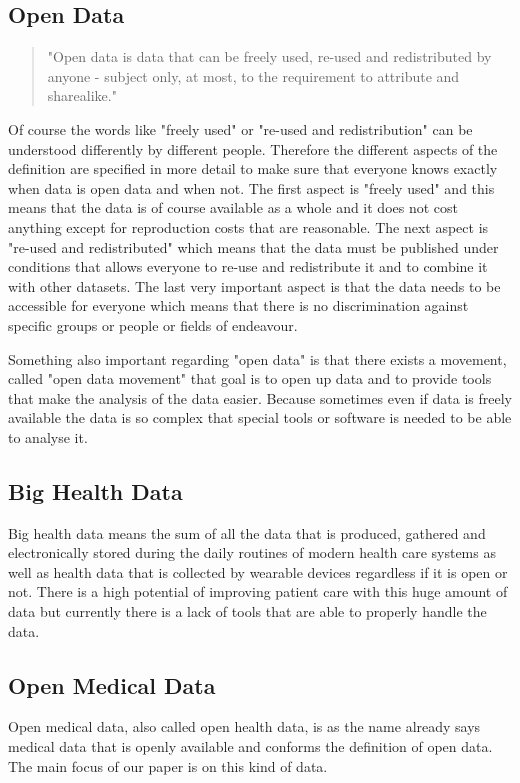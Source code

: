 \documentclass[a4paper, 11pt]{article}
\begin{document}
\subsection{Open Data}
\begin{quote}
    "Open data is data that can be freely used, re-used and redistributed by anyone - subject only, at most, to the requirement to attribute and sharealike." \cite{whatIsOpenData}
\end{quote}
Of course the words like "freely used" or "re-used and redistribution" can be understood differently by different people. Therefore the different aspects of the definition are specified in more detail to make sure that everyone knows exactly when data is open data and when not. The first aspect is "freely used" and this means that the data is of course available as a whole and it does not cost anything except for reproduction costs that are reasonable. 
The next aspect is "re-used and redistributed" which means that the data must be published under conditions that allows everyone to re-use and redistribute it and to combine it with other datasets. 
The last very important aspect is that the data needs to be accessible for everyone which means that there is no discrimination against specific groups or people or fields of endeavour. \cite{whatIsOpenData}

Something also important regarding "open data" is that there exists a movement, called "open data movement" that goal is to open up data and to provide tools that make the analysis of the data easier. Because sometimes even if data is freely available the data is so complex that special tools or software is needed to be able to analyse it. \cite{kitchin2014dataRevolution}

\subsection{Big Health Data}
Big health data means the sum of all the data that is produced, gathered and electronically stored during the daily routines of modern health care systems as well as health data that is collected by wearable devices regardless if it is open or not. There is a high potential of improving patient care with this huge amount of data but currently there is a lack of tools that are able to properly handle the data. \cite{schneeweiss2014learning, Kostkova_et_al_2016}

\subsection{Open Medical Data}
Open medical data, also called open health data, is as the name already says medical data that is openly available and conforms the definition of open data. The main focus of our paper is on this kind of data. 
\end{document}
